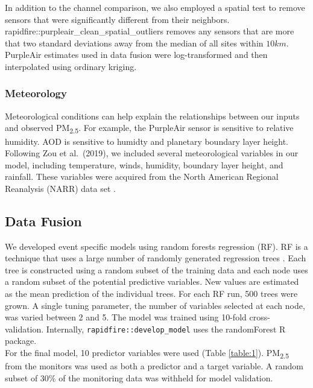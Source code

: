 \documentclass[gmd, manuscript]{copernicus}
\begin{document}
In addition to the channel comparison, we also employed a spatial test
to remove sensors that were significantly different from their
neighbors. rapidfire::purpleair\_clean\_spatial\_outliers removes any
sensors that are more that two standard deviations away from the median
of all sites within \(10\unit {km}\). PurpleAir estimates used in data
fusion were log-transformed and then interpolated using ordinary
kriging.

\subsubsection{Meteorology}

Meteorological conditions can help explain the relationships between our
inputs and observed PM\textsubscript{2.5}. For example, the PurpleAir
sensor is sensitive to relative humidity. AOD is sensitive to humidty
and planetary boundary layer height. Following Zou et al.~(2019), we
included several meteorological variables in our model, including
temperature, winds, humidity, boundary layer height, and rainfall. These
variables were acquired from the North American Regional Reanalysis
(NARR) data set \citep{Mesinger2006}.

\subsection{Data Fusion}

We developed event specific models using random forests regression (RF).
RF is a technique that uses a large number of randomly generated
regression trees \citep{Breiman2001}. Each tree is constructed using a
random subset of the training data and each node uses a random subset of
the potential predictive variables. New values are estimated as the mean
prediction of the individual trees. For each RF run, 500 trees were
grown. A single tuning parameter, the number of variables selected at
each node, was varied between 2 and 5. The model was trained using
10-fold cross-validation. Internally, \texttt{rapidfire::develop\_model}
uses the randomForest R package.\\
For the final model, 10 predictor variables were used (Table
\ref{table:1}). PM\textsubscript{2.5} from the monitors was used as both
a predictor and a target variable. A random subset of 30\% of the
monitoring data was withheld for model validation.
\end{document}
